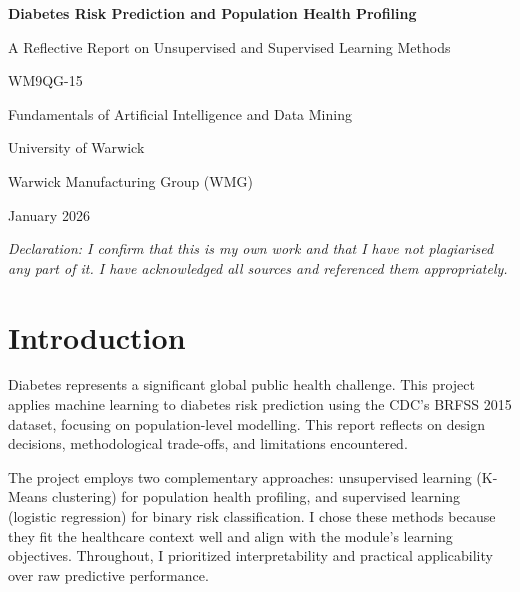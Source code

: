 \documentclass[12pt,a4paper]{article}
\begin{document}
\begin{titlepage}
    \centering
    \vspace*{2cm}
    
    {\LARGE\bfseries Diabetes Risk Prediction and Population Health Profiling\par}
    \vspace{1cm}
    {\large A Reflective Report on Unsupervised and Supervised Learning Methods\par}
    \vspace{2cm}
    
    {\large WM9QG-15\par}
    {\large Fundamentals of Artificial Intelligence and Data Mining\par}
    \vspace{1cm}
    
    {\large University of Warwick\par}
    {\large Warwick Manufacturing Group (WMG)\par}
    \vspace{2cm}
    
    {\large January 2026\par}
    \vfill
    
    \textit{Declaration: I confirm that this is my own work and that I have not plagiarised any part of it. I have acknowledged all sources and referenced them appropriately.}
\end{titlepage}

\tableofcontents
\newpage

\section{Introduction}

Diabetes represents a significant global public health challenge. This project applies machine learning to diabetes risk prediction using the CDC's BRFSS 2015 dataset, focusing on population-level modelling. This report reflects on design decisions, methodological trade-offs, and limitations encountered.

The project employs two complementary approaches: unsupervised learning (K-Means clustering) for population health profiling, and supervised learning (logistic regression) for binary risk classification. I chose these methods because they fit the healthcare context well and align with the module's learning objectives. Throughout, I prioritized interpretability and practical applicability over raw predictive performance.
\end{document}
